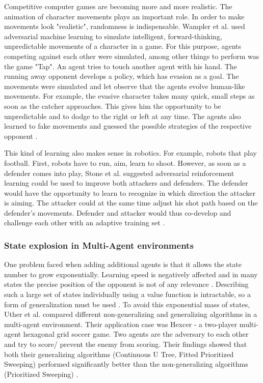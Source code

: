 Competitive computer games are becoming more and more realistic. The animation of character movements plays an important role. In order to make movements look "realistic", randomness is indispensable. Wampler et al. \cite{animationwampler2010character} used adversarial machine learning to simulate intelligent, forward-thinking, unpredictable movements of a character in a game. 
For this purpose, agents competing against each other were simulated, among other things to perform was the game "Tap". An agent tries to touch another agent with his hand. The running away opponent develops a policy, which has evasion as a goal.
The movements were simulated and let observe that the agents evolve human-like movements. For example, the evasive character takes many quick, small steps as soon as the catcher approaches. This gives him the opportunity to be unpredictable and to dodge to the right or left at any time.
The agents also learned to fake movements and guessed the possible strategies of the respective opponent \cite{animationwampler2010character}.

This kind of learning also makes sense in robotics. For example, robots that play football. First, robots have to run, aim, learn to shoot. However, as soon as a defender comes into play, Stone et al. \cite{roboticstone1998towards} suggested adversarial reinforcement learning could be used to improve both attackers and defenders. The defender would have the opportunity to learn to recognize in which direction the attacker is aiming. The attacker could at the same time adjust his shot path based on the defender's movements. 
Defender and attacker would thus co-develop and challenge each other with an adaptive training set \cite{roboticstone1998towards}.

\subsubsection{State explosion in Multi-Agent environments}

One problem faced when adding additional agents is that it allows the state number to grow exponentially. Learning speed is negatively affected and in many states the precise position of the opponent is not of any relevance \cite{multiuther1997generalizing}.
Describing such a large set of states individually using a value function is intractable, so a form of generalization must be used \cite{boyan1995generalization}. 
To avoid this exponential mass of states, Uther et al. \cite{multiuther1997generalizing} compared different non-generalizing and generalizing algorithms in a multi-agent environment. 
Their application case was Hexcer - a two-player multi-agent hexagonal grid soccer game. Two agents are the adversary to each other and try to score/ prevent the enemy from scoring. Their findings showed that both their generalizing algorithms (Continuous U Tree, Fitted Prioritized Sweeping) performed significantly better than the non-generalizing algorithms (Prioritized Sweeping) \cite{multiuther1997generalizing}.

